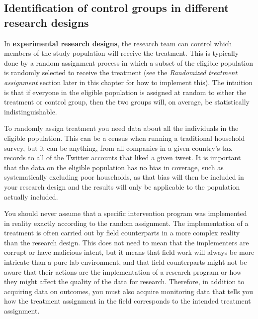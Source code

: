 \subsection{Identification of control groups in different research designs}


In \textbf{experimental research designs},
 
the research team can control which members
of the study population will receive the treatment.
This is typically done by a random assignment process
in which a subset of the eligible population
is randomly selected to receive the treatment
(see the \textit{Randomized treatment assignment} section 
later in this chapter for how to implement this).
The intuition is that if everyone in the eligible population
is assigned at random to either the treatment or control group,
then the two groups will, on average, be statistically indistinguishable.

To randomly assign treatment you need data
about all the individuals in the eligible population.
This can be a census when running a traditional household survey,
but it can be anything, from all companies in a given country's tax records
to all of the Twitter accounts that liked a given tweet.
It is important that the data on the eligible population has no bias in coverage,
such as systematically excluding poor households,
as that bias will then be included in your research design
and the results will only be applicable to the population actually included.

You should never assume that a specific intervention program
was implemented in reality exactly according to the random assignment.
The implementation of a treatment is often carried out
by field counterparts in a more complex reality than the research design.
This does not need to mean that the implementers are corrupt or have malicious intent,
but it means that field work will always be more intricate than a pure lab environment,
and that field counterparts might not be aware
that their actions are the implementation of a research program
or how they might affect the quality of the data for research.
Therefore, in addition to acquiring data on outcomes,
you must also acquire monitoring data
that tells you how the treatment assignment in the field
corresponds to the intended treatment assignment.

